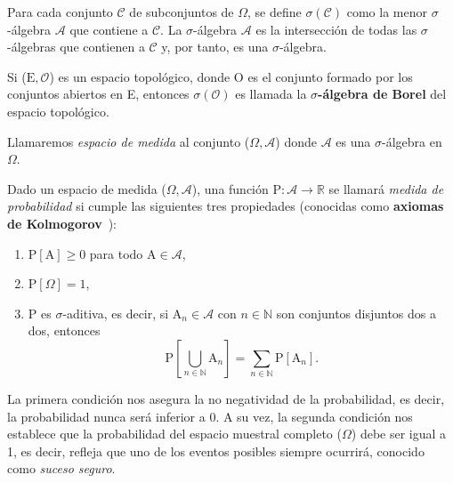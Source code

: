 \begin{definicion}\label{def:sigma-algebra-borel}
    Para cada conjunto $\mathcal{C}$ de subconjuntos de $\Omega$, se define $\sigma(\mathcal{C})$ como la menor $\sigma$-álgebra $\mathcal{A}$ que contiene a $\mathcal{C}$. La $\sigma$-álgebra $\mathcal{A}$ es la intersección de todas las $\sigma$-álgebras que contienen a $\mathcal{C}$ y, por tanto, es una $\sigma$-álgebra.

    Si ($\mathrm{E}, \mathcal{O}$) es un espacio topológico, donde $\mathrm{O}$ es el conjunto formado por los conjuntos abiertos en E, entonces $\sigma(\mathcal{O})$ es llamada la \textbf{$\sigma$-álgebra de Borel} del espacio topológico.
\end{definicion}

Llamaremos \emph{espacio de medida} al conjunto ($\Omega, \mathcal{A}$) donde $\mathcal{A}$ es una $\sigma$-álgebra en $\Omega$.\newline

\begin{definicion}\label{def:medida-de-probabilidad}
    Dado un espacio de medida ($\Omega, \mathcal{A}$), una función $\mathrm{P}: \mathcal{A} \to \mathbb{R}$ se llamará \emph{medida de probabilidad} si cumple las siguientes tres propiedades (conocidas como \textbf{axiomas de Kolmogorov}~\cite{Kolmogorov1956}):

    \begin{enumerate}
        \item $\mathrm{P}[\mathrm{A}] \ge 0$ para todo $\mathrm{A} \in \mathcal{A}$,
        \item $\mathrm{P}[\Omega]=1$,
        \item $\mathrm{P}$ es $\sigma$-aditiva, es decir, si $\mathrm{A}_n \in \mathcal{A}$ con $n \in \mathbb{N}$ son conjuntos disjuntos dos a dos, entonces 
        \[ \mathrm{P}\left[\bigcup_{n \in \mathbb{N}} \mathrm{A}_{n}\right] = \sum\limits_{n \in \mathbb{N}} \mathrm{P}[\mathrm{A}_n]. \]
    \end{enumerate}
\end{definicion}

La primera condición nos asegura la no negatividad de la probabilidad, es decir, la probabilidad nunca será inferior a $0$. A su vez, la segunda condición nos establece que la probabilidad del espacio muestral completo ($\Omega$) debe ser igual a 1, es decir, refleja que uno de los eventos posibles siempre ocurrirá, conocido como \emph{suceso seguro}.\newline

